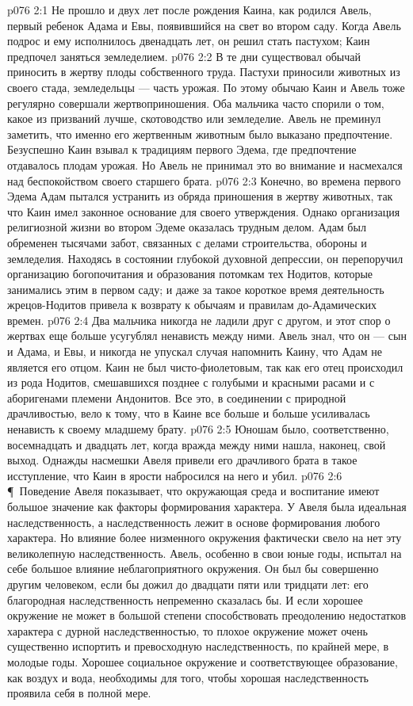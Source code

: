 \vs p076 2:1 Не прошло и двух лет после рождения Каина, как родился Авель, первый ребенок Адама и Евы, появившийся на свет во втором саду. Когда Авель подрос и ему исполнилось двенадцать лет, он решил стать пастухом; Каин предпочел заняться земледелием.
\vs p076 2:2 В те дни существовал обычай приносить в жертву плоды собственного труда. Пастухи приносили животных из своего стада, земледельцы --- часть урожая. По этому обычаю Каин и Авель тоже регулярно совершали жертвоприношения. Оба мальчика часто спорили о том, какое из призваний лучше, скотоводство или земледелие. Авель не преминул заметить, что именно его жертвенным животным было выказано предпочтение. Безуспешно Каин взывал к традициям первого Эдема, где предпочтение отдавалось плодам урожая. Но Авель не принимал это во внимание и насмехался над беспокойством своего старшего брата.
\vs p076 2:3 Конечно, во времена первого Эдема Адам пытался устранить из обряда приношения в жертву животных, так что Каин имел законное основание для своего утверждения. Однако организация религиозной жизни во втором Эдеме оказалась трудным делом. Адам был обременен тысячами забот, связанных с делами строительства, обороны и земледелия. Находясь в состоянии глубокой духовной депрессии, он перепоручил организацию богопочитания и образования потомкам тех Нодитов, которые занимались этим в первом саду; и даже за такое короткое время деятельность жрецов\hyp{}Нодитов привела к возврату к обычаям и правилам до\hyp{}Адамических времен.
\vs p076 2:4 Два мальчика никогда не ладили друг с другом, и этот спор о жертвах еще больше усугублял ненависть между ними. Авель знал, что он --- сын и Адама, и Евы, и никогда не упускал случая напомнить Каину, что Адам не является его отцом. Каин не был чисто\hyp{}фиолетовым, так как его отец происходил из рода Нодитов, смешавшихся позднее с голубыми и красными расами и с аборигенами племени Андонитов. Все это, в соединении с природной драчливостью, вело к тому, что в Каине все больше и больше усиливалась ненависть к своему младшему брату.
\vs p076 2:5 Юношам было, соответственно, восемнадцать и двадцать лет, когда вражда между ними нашла, наконец, свой выход. Однажды насмешки Авеля привели его драчливого брата в такое исступление, что Каин в ярости набросился на него и убил.
\vs p076 2:6 \P\ Поведение Авеля показывает, что окружающая среда и воспитание имеют большое значение как факторы формирования характера. У Авеля была идеальная наследственность, а наследственность лежит в основе формирования любого характера. Но влияние более низменного окружения фактически свело на нет эту великолепную наследственность. Авель, особенно в свои юные годы, испытал на себе большое влияние неблагоприятного окружения. Он был бы совершенно другим человеком, если бы дожил до двадцати пяти или тридцати лет: его благородная наследственность непременно сказалась бы. И если хорошее окружение не может в большой степени способствовать преодолению недостатков характера с дурной наследственностью, то плохое окружение может очень существенно испортить и превосходную наследственность, по крайней мере, в молодые годы. Хорошее социальное окружение и соответствующее образование, как воздух и вода, необходимы для того, чтобы хорошая наследственность проявила себя в полной мере.
